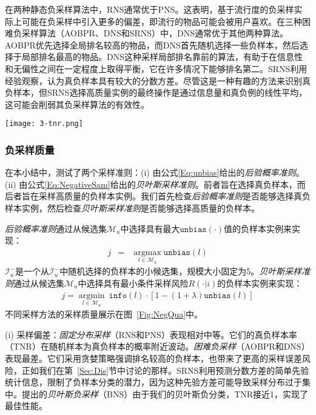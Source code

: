 在两种静态负采样算法中，\textsf{RNS}通常优于\textsf{PNS}。这表明，基于流行度的负采样实际上可能在负采样中引入更多的偏差，即流行的物品可能会被用户喜欢。在三种困难负采样算法（\textsf{AOBPR}、\textsf{DNS}和\textsf{SRNS}）中，\textsf{DNS}通常优于其他两种算法。\textsf{AOBPR}优先选择全局排名较高的物品，而\textsf{DNS}首先随机选择一些负样本，然后选择于局部排名最高的物品。\textsf{DNS}这种采样局部排名靠前的算法，有助于在信息性和无偏性之间在一定程度上取得平衡，它在许多情况下能够排名第二。\textsf{SRNS}利用经验观察，认为真负样本具有较大的分数方差。尽管这是一种有趣的方法来识别真负样本，但\textsf{SRNS}选择高质量实例的最终操作是通过信息量和真负例的线性平均，这可能会削弱其负采样算法的有效性。
\begin{figure*}[!]
	\centering
	\texttt{[image: 3-tnr.png]}
	\caption{不同方法的采样质量比较}
	\label{Fig:NegQua}
\end{figure*}
\subsubsection{负采样质量}
在本小结中，测试了两个采样准则：(i) 由公式\eqref{Eq:unbias}给出的\textit{后验概率准则}。(ii) 由公式\eqref{Eq:NegativeSam}给出的\textit{贝叶斯采样准则}。前者旨在选择真负样本，而后者旨在采样高质量的负样本实例。我们首先检查\textit{后验概率准则}是否能够选择真负样本实例，然后检查\textit{贝叶斯采样准则}是否能够选择高质量的负样本。

\textit{后验概率准则}通过从候选集$\mathcal{M}_u$中选择具有最大$\mathtt{unbias}(\cdot)$值的负样本实例来实现：
\begin{eqnarray} \label{Eq:PosteriorSam}
	j   &=&   \mathop{\arg\max}\limits_{l \in \mathcal{M}_u} \mathtt{unbias}(l)
\end{eqnarray}
$\mathcal{I}_u^-$是一个从$\mathcal{I}_u^-$中随机选择的负样本的小候选集，规模大小固定为5。\textit{贝叶斯采样准则}通过从候选集$\mathcal{M}_u$中选择具有最小条件采样风险$R(\cdot|i)$的负样本实例来实现：
\begin{eqnarray} \label{Eq:NegativeSam1}
	j  = \mathop{\arg\min}\limits_{l \in\mathcal{M}_u}~ \mathtt{info}(l)\cdot [1-(1+\lambda)\mathtt{unbias}(l)]
\end{eqnarray}
不同采样方法的采样质量展示在图~\ref{Fig:NegQua}中。

(i) 采样偏差：\textit{固定分布采样}（\textsf{RNS}和\textsf{PNS}）表现相对中等。它们的真负样本率（TNR）在随机样本为真负样本的概率附近波动。\textit{困难负采样}（\textsf{AOBPR}和\textsf{DNS}）表现最差。它们采用贪婪策略强调排名较高的负样本，也带来了更高的采样误差风险，正如我们在第~\ref{Sec:Dis}节中讨论的那样。\textsf{SRNS}利用预测分数方差的简单先验统计信息，限制了负样本分类的潜力，因为这种先验方差可能导致采样分布过于集中。提出的\textit{贝叶斯负采样}（\textsf{BNS}）由于我们的贝叶斯负分类，TNR接近1，实现了最佳性能。

